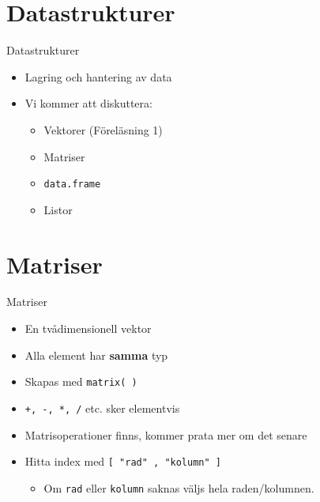 \documentclass[
  11pt,
  ignorenonframetext,
]{beamer}
\providecommand{\tightlist}{%
  \setlength{\itemsep}{0pt}\setlength{\parskip}{0pt}}
\newcommand\imp[1]{\alert{\textbf{#1}}}
\begin{document}
\hypertarget{datastrukturer}{%
\section{Datastrukturer}\label{datastrukturer}}

\begin{frame}{Datastrukturer}
\protect\hypertarget{datastrukturer-1}{}
\begin{itemize}
\tightlist
\item
  Lagring och hantering av data
\item
  Vi kommer att diskuttera:

  \begin{itemize}
  \tightlist
  \item
    Vektorer (Föreläsning 1)
  \item
    Matriser
  \item
    \texttt{data.frame}
  \item
    Listor
  \end{itemize}
\end{itemize}
\end{frame}

\hypertarget{matriser}{%
\section{Matriser}\label{matriser}}

\begin{frame}{Matriser}
\protect\hypertarget{matriser-1}{}
\begin{itemize}
\tightlist
\item
  En tvådimensionell vektor
\item
  Alla element har \imp{samma} typ
\item
  Skapas med \texttt{matrix( )}
\item
  \texttt{+, -, *, /} etc. sker elementvis
\item
  Matrisoperationer finns, kommer prata mer om det senare
\item
  Hitta index med \texttt{[ "rad" , "kolumn" ]}

  \begin{itemize}
  \tightlist
  \item
    Om \texttt{rad} eller \texttt{kolumn} saknas väljs hela
    raden/kolumnen.
  \end{itemize}
\end{itemize}
\end{frame}
\end{document}
